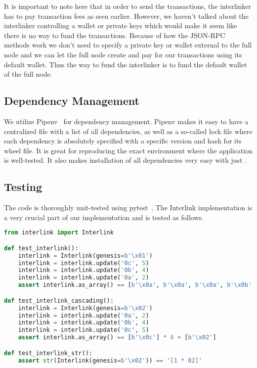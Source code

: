 It is important to note here that in order to send the transactions, the interlinker has to pay transaction fees as seen earlier. However, we haven't talked about the interlinker controlling a wallet or private keys which would make it seem like there is no way to fund the transactions. Because of how the JSON-RPC methods work we don't need to specify a private key or wallet external to the full node and we can let the full node create and pay for our transactions using its default wallet. Thus the way to fund the interlinker is to fund the default wallet of the full node.

\subsection{Dependency Management}

We utilize Pipenv~\cite{pipenv} for dependency management. Pipenv makes it easy to have a centralized file with a list of all dependencies, as well as a so-called lock file where each dependency is absolutely specified with a specific version and hash for its wheel file. It is great for reproducing the exact environment where the application is well-tested. It also makes installation of all dependencies very easy with just .

\subsection{Testing}

The code is thoroughly unit-tested using pytest~\cite{pytest}. The Interlink implementation is a very crucial part of our implementation and is tested as follows.

\begin{lstlisting}[language=Python]
from interlink import Interlink

def test_interlink():
    interlink = Interlink(genesis=b'\x01')
    interlink = interlink.update('0c', 5)
    interlink = interlink.update('0b', 4)
    interlink = interlink.update('0a', 2)
    assert interlink.as_array() == [b'\x0a', b'\x0a', b'\x0a', b'\x0b', b'\x0b', b'\x0c', b'\x01']

def test_interlink_cascading():
    interlink = Interlink(genesis=b'\x02')
    interlink = interlink.update('0a', 2)
    interlink = interlink.update('0b', 4)
    interlink = interlink.update('0c', 5)
    assert interlink.as_array() == [b'\x0c'] * 6 + [b'\x02']

def test_interlink_str():
    assert str(Interlink(genesis=b'\x02')) == '[1 * 02]'
\end{lstlisting}

